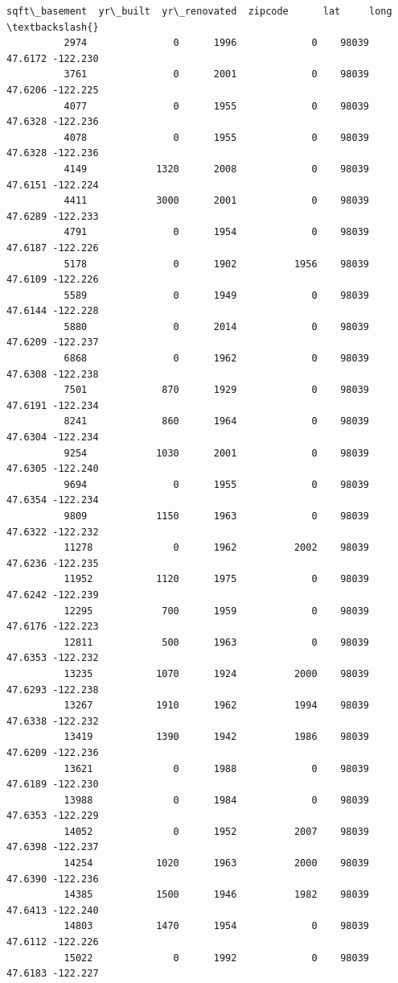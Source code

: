 \documentclass[11pt]{article}
\begin{document}
\begin{Verbatim}[commandchars=\\\{\}]
                 sqft\_basement  yr\_built  yr\_renovated  zipcode      lat     long  \textbackslash{}
          2974               0      1996             0    98039  47.6172 -122.230   
          3761               0      2001             0    98039  47.6206 -122.225   
          4077               0      1955             0    98039  47.6328 -122.236   
          4078               0      1955             0    98039  47.6328 -122.236   
          4149            1320      2008             0    98039  47.6151 -122.224   
          4411            3000      2001             0    98039  47.6289 -122.233   
          4791               0      1954             0    98039  47.6187 -122.226   
          5178               0      1902          1956    98039  47.6109 -122.226   
          5589               0      1949             0    98039  47.6144 -122.228   
          5880               0      2014             0    98039  47.6209 -122.237   
          6868               0      1962             0    98039  47.6308 -122.238   
          7501             870      1929             0    98039  47.6191 -122.234   
          8241             860      1964             0    98039  47.6304 -122.234   
          9254            1030      2001             0    98039  47.6305 -122.240   
          9694               0      1955             0    98039  47.6354 -122.234   
          9809            1150      1963             0    98039  47.6322 -122.232   
          11278              0      1962          2002    98039  47.6236 -122.235   
          11952           1120      1975             0    98039  47.6242 -122.239   
          12295            700      1959             0    98039  47.6176 -122.223   
          12811            500      1963             0    98039  47.6353 -122.232   
          13235           1070      1924          2000    98039  47.6293 -122.238   
          13267           1910      1962          1994    98039  47.6338 -122.232   
          13419           1390      1942          1986    98039  47.6209 -122.236   
          13621              0      1988             0    98039  47.6189 -122.230   
          13988              0      1984             0    98039  47.6353 -122.229   
          14052              0      1952          2007    98039  47.6398 -122.237   
          14254           1020      1963          2000    98039  47.6390 -122.236   
          14385           1500      1946          1982    98039  47.6413 -122.240   
          14803           1470      1954             0    98039  47.6112 -122.226   
          15022              0      1992             0    98039  47.6183 -122.227   

\end{Verbatim}
\end{document}
